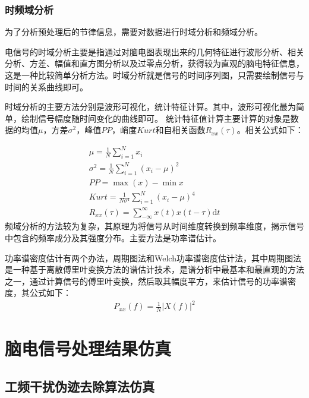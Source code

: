 \documentclass{ctexart}
\begin{document}
			\subsubsection{时频域分析}
				为了分析预处理后的节律信息，需要对数据进行时域分析和频域分析。\par
				电信号的时域分析主要是指通过对脑电图表现出来的几何特征进行波形分析、相关分析、方差、幅值和直方图分析以及过零点分析，获得较为直观的脑电特征信息，这是一种比较简单分析方法。时域分析就是信号的时间序列图，只需要绘制信号与时间的关系曲线即可。\par
				时域分析的主要方法分别是波形可视化，统计特征计算。其中，波形可视化最为简单，绘制信号幅度随时间变化的曲线即可。
				统计特征值计算主要计算的对象是数据的均值$\mu$，方差$\sigma^2$，峰值$PP$，峭度$Kurt$和自相关函数$R_{xx}(\tau)$。相关公式如下：\par
				\begin{gather}
					\mu=\frac{1}{N}\sum_{i=1}^{N}x_i\\
					\sigma^2=\frac{1}{N}\sum_{i=1}^{N}(x_i-\mu)^2\\
					PP=\max(x)-\min{x}\\
					Kurt=\frac{1}{N\sigma^4}\sum_{i=1}^{N}(x_i-\mu)^4\\
					R_{xx}(\tau)=\sum_{-\infty}^{\infty}x(t)x(t-\tau)\mathrm{d}t
				\end{gather}
				频域分析的方法较为复杂，其原理为将信号从时间维度转换到频率维度，揭示信号中包含的频率成分及其强度分布。主要方法是功率谱估计。\par
				功率谱密度估计有两个办法，周期图法和Welch功率谱密度估计法，其中周期图法是一种基于离散傅里叶变换方法的谱估计技术，是谱分析中最基本和最直观的方法之一，通过计算信号的傅里叶变换，然后取其幅度平方，来估计信号的功率谱密度，其公式如下：
				\begin{gather}
					P_{xx}(f)=\frac{1}{N}\lvert X(f)\rvert^2
				\end{gather}
				
	\newpage
	\section{脑电信号处理结果仿真}
		\subsection{工频干扰伪迹去除算法仿真}
\end{document}
